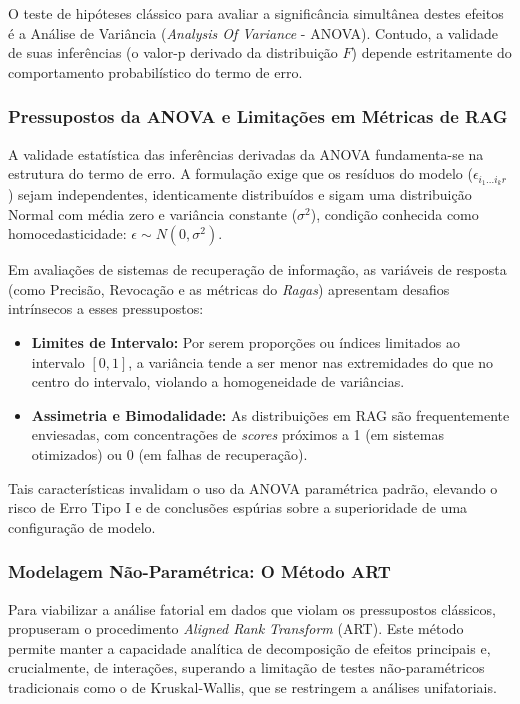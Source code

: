 O teste de hipóteses clássico para avaliar a significância simultânea destes efeitos é a Análise de Variância (\textit{Analysis Of Variance} - ANOVA). Contudo, a validade de suas inferências (o valor-p derivado da distribuição $F$) depende estritamente do comportamento probabilístico do termo de erro.

\subsubsection{Pressupostos da ANOVA e Limitações em Métricas de RAG}

A validade estatística das inferências derivadas da ANOVA fundamenta-se na estrutura do termo de erro. A formulação exige que os resíduos do modelo ($\epsilon_{i_1 \dots i_k r}$) sejam independentes, identicamente distribuídos e sigam uma distribuição Normal com média zero e variância constante ($\sigma^2$), condição conhecida como homocedasticidade: $\epsilon \sim N(0, \sigma^2)$.

Em avaliações de sistemas de recuperação de informação, as variáveis de resposta (como Precisão, Revocação e as métricas do \textit{Ragas}) apresentam desafios intrínsecos a esses pressupostos:
\begin{itemize}
  \item \textbf{Limites de Intervalo:} Por serem proporções ou índices limitados ao intervalo $[0, 1]$, a variância tende a ser menor nas extremidades do que no centro do intervalo, violando a homogeneidade de variâncias.
  \item \textbf{Assimetria e Bimodalidade:} As distribuições em RAG são frequentemente enviesadas, com concentrações de \textit{scores} próximos a 1 (em sistemas otimizados) ou 0 (em falhas de recuperação).
\end{itemize}
Tais características invalidam o uso da ANOVA paramétrica padrão, elevando o risco de Erro Tipo I e de conclusões espúrias sobre a superioridade de uma configuração de modelo.

\subsubsection{Modelagem Não-Paramétrica: O Método ART}

Para viabilizar a análise fatorial em dados que violam os pressupostos clássicos, \citet{10.1145/1978942.1978963} propuseram o procedimento \textit{Aligned Rank Transform} (ART). Este método permite manter a capacidade analítica de decomposição de efeitos principais e, crucialmente, de interações, superando a limitação de testes não-paramétricos tradicionais como o de Kruskal-Wallis, que se restringem a análises unifatoriais.

